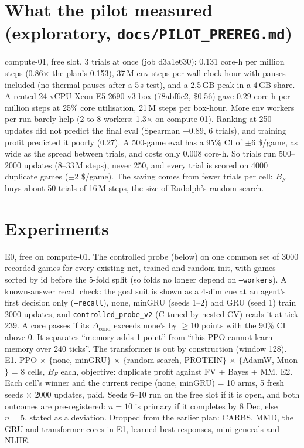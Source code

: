 \documentclass[10pt]{article}
\newcommand{\file}[1]{{\small\texttt{#1}}}
\begin{document}
\section{What the pilot measured (exploratory, \file{docs/PILOT\_PREREG.md})}
compute-01, free slot, 3 trials at once (job d3a1e630): 0.131 core-h per million steps (0.86$\times$ the plan's 0.153), 37\,M env steps per wall-clock hour with pauses included (no thermal pauses after a 5\,s test), and a 2.5\,GB peak in a 4\,GB share. A rented 24-vCPU Xeon E5-2690 v3 box (78abf6c2, \$0.56) gave 0.29 core-h per million steps at 25\% core utilisation, 21\,M steps per box-hour. More env workers per run barely help (2 to 8 workers: 1.3$\times$ on compute-01). Ranking at 250 updates did not predict the final eval (Spearman $-0.89$, 6 trials), and training profit predicted it poorly (0.27). A 500-game eval has a 95\% CI of $\pm$6 \$/game, as wide as the spread between trials, and costs only 0.008 core-h. So trials run 500--2000 updates (8--33\,M steps), never 250, and every trial is scored on 4000 duplicate games ($\pm$2 \$/game). The saving comes from fewer trials per cell: $B_F$ buys about 50 trials of 16\,M steps, the size of Rudolph's random search.

\section{Experiments}
E0, free on compute-01. The controlled probe (below) on one common set of 3000 recorded games for every existing net, trained and random-init, with games sorted by id before the 5-fold split (so folds no longer depend on \texttt{--workers}). A known-answer recall check: the goal suit is shown as a 4-dim cue at an agent's first decision only (\texttt{--recall}), none, minGRU (seeds 1--2) and GRU (seed 1) train 2000 updates, and \file{controlled\_probe\_v2} (C tuned by nested CV) reads it at tick 239. A core passes if its $\Delta_{\text{cond}}$ exceeds none's by $\geq$10 points with the 90\% CI above 0. It separates ``memory adds 1 point'' from ``this PPO cannot learn memory over 240 ticks''. The transformer is out by construction (window 128).
E1. PPO $\times$ $\{$none, minGRU$\}$ $\times$ $\{$random search, PROTEIN$\}$ $\times$ $\{$AdamW, Muon$\}$ = 8 cells, $B_F$ each, objective: duplicate profit against FV + Bayes + MM.
E2. Each cell's winner and the current recipe (none, minGRU) = 10 arms, 5 fresh seeds $\times$ 2000 updates, paid. Seeds 6--10 run on the free slot if it is open, and both outcomes are pre-registered: $n=10$ is primary if it completes by 8 Dec, else $n=5$, stated as a deviation.
Dropped from the earlier plan: CARBS, MMD, the GRU and transformer cores in E1, learned best responses, mini-generals and NLHE.
\end{document}

